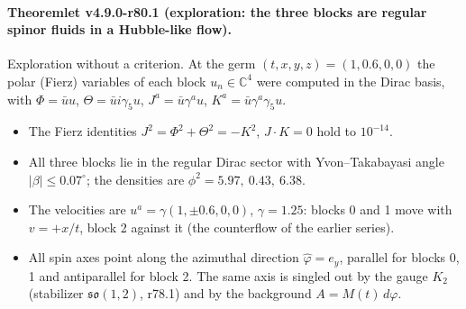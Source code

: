 \paragraph{Theoremlet v4.9.0-r80.1 (exploration: the three blocks are regular spinor fluids in a Hubble-like flow).}
Exploration without a criterion.  At the germ \((t,x,y,z)=(1,0.6,0,0)\) the polar (Fierz) variables of each block
\(u_n\in\mathbb C^4\) were computed in the Dirac basis, with \(\Phi=\bar u u\), \(\Theta=\bar u i\gamma_5u\),
\(J^a=\bar u\gamma^a u\), \(K^a=\bar u\gamma^a\gamma_5u\).
\begin{itemize}[leftmargin=2em]
\item The Fierz identities \(J^2=\Phi^2+\Theta^2=-K^2\), \(J\cdot K=0\) hold to \(10^{-14}\).
\item All three blocks lie in the regular Dirac sector with Yvon--Takabayasi angle \(|\beta|\le0.07^\circ\); the densities
are \(\phi^2=5.97,\ 0.43,\ 6.38\).
\item The velocities are \(u^a=\gamma(1,\pm0.6,0,0)\), \(\gamma=1.25\): blocks 0 and 1 move with \(v=+x/t\), block 2 against
it (the counterflow of the earlier series).
\item All spin axes point along the azimuthal direction \(\hat\varphi=e_y\), parallel for blocks 0, 1 and antiparallel for
block 2.  The same axis is singled out by the gauge \(K_2\) (stabilizer \(\mathfrak{so}(1,2)\), r78.1) and by the background
\(A=M(t)\,d\varphi\).
\end{itemize}

